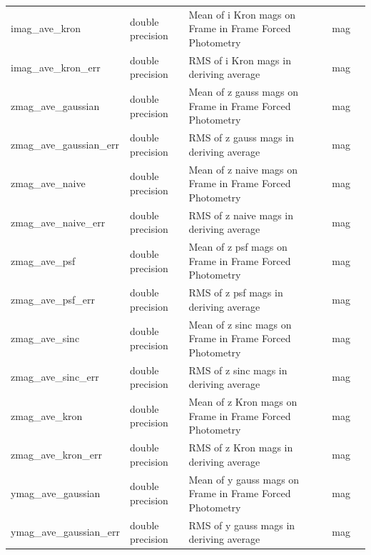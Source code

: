 \documentclass[12pt]{article}
\begin{document}
\begin{table}[thbp]
\begin{center}
{\begin{tabular}{llllll}
imag\_ave\_kron & double precision & Mean of i Kron mags on Frame in Frame Forced Photometry      &                        & mag            &   \\
imag\_ave\_kron\_err & double precision & RMS of i Kron mags in deriving average               &                        & mag            &   \\
zmag\_ave\_gaussian & double precision & Mean of z gauss mags on Frame in Frame Forced Photometry  &                        & mag            &   \\
zmag\_ave\_gaussian\_err & double precision & RMS of z gauss mags in deriving average               &                        & mag            &   \\
zmag\_ave\_naive & double precision & Mean of z naive mags on Frame in Frame Forced Photometry  &                        & mag            &   \\
zmag\_ave\_naive\_err & double precision & RMS of z naive mags in deriving average               &                        & mag            &   \\
zmag\_ave\_psf & double precision & Mean of z psf mags on Frame in Frame Forced Photometry      &                        & mag            &   \\
zmag\_ave\_psf\_err & double precision & RMS of z psf mags in deriving average               &                        & mag            &   \\
zmag\_ave\_sinc & double precision & Mean of z sinc mags on Frame in Frame Forced Photometry      &                        & mag            &   \\
zmag\_ave\_sinc\_err & double precision & RMS of z sinc mags in deriving average               &                        & mag            &   \\
zmag\_ave\_kron & double precision & Mean of z Kron mags on Frame in Frame Forced Photometry      &                        & mag            &   \\
zmag\_ave\_kron\_err & double precision & RMS of z Kron mags in deriving average               &                        & mag            &   \\
ymag\_ave\_gaussian & double precision & Mean of y gauss mags on Frame in Frame Forced Photometry  &                        & mag            &   \\
ymag\_ave\_gaussian\_err & double precision & RMS of y gauss mags in deriving average               &                        & mag            &   \\

\end{tabular}}
\end{center}
\end{table}
\end{document}
